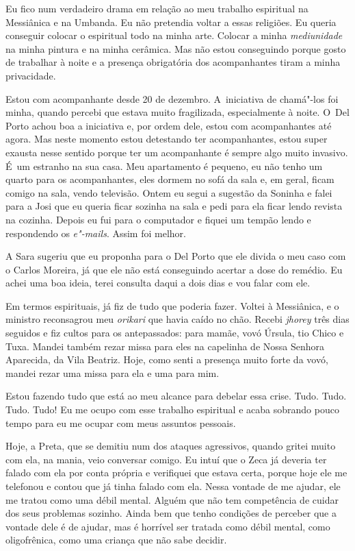 Eu fico num verdadeiro drama em relação ao meu trabalho espiritual na
Messiânica e na Umbanda. Eu não pretendia voltar a essas religiões. Eu
queria conseguir colocar o espiritual todo na minha arte. Colocar a
minha \emph{mediunidade} na minha pintura e na minha cerâmica. Mas não
estou conseguindo porque gosto de trabalhar à noite e a presença
obrigatória dos acompanhantes tiram a minha privacidade.

Estou com acompanhante desde 20 de dezembro. A~iniciativa de chamá"-los
foi minha, quando percebi que estava muito fragilizada, especialmente à
noite. O~Del Porto achou boa a iniciativa e, por ordem dele, estou com
acompanhantes até agora. Mas neste momento estou detestando ter
acompanhantes, estou super exausta nesse sentido porque ter um
acompanhante é sempre algo muito invasivo. É~um estranho na sua casa.
Meu apartamento é pequeno, eu não tenho um quarto para os acompanhantes,
eles dormem no sofá da sala e, em geral, ficam comigo na sala, vendo
televisão. Ontem eu segui a sugestão da Soninha e falei para a Josi que
eu queria ficar sozinha na sala e pedi para ela ficar lendo revista na
cozinha. Depois eu fui para o computador e fiquei um tempão lendo e
respondendo os \emph{e"-mails}. Assim foi melhor.

A Sara sugeriu que eu proponha para o Del Porto que ele divida o meu
caso com o Carlos Moreira, já que ele não está conseguindo acertar a
dose do remédio. Eu achei uma boa ideia, terei consulta daqui a dois
dias e vou falar com ele.

Em termos espirituais, já fiz de tudo que poderia fazer. Voltei à
Messiânica, e o ministro reconsagrou meu \emph{orikari} que havia caído
no chão. Recebi \emph{jhorey} três dias seguidos e fiz cultos para os
antepassados: para mamãe, vovó Úrsula, tio Chico e Tuxa. Mandei também
rezar missa para eles na capelinha de Nossa Senhora Aparecida, da Vila
Beatriz. Hoje, como senti a presença muito forte da vovó, mandei rezar
uma missa para ela e uma para mim.

Estou fazendo tudo que está ao meu alcance para debelar essa crise.
Tudo. Tudo. Tudo. Tudo! Eu me ocupo com esse trabalho espiritual e acaba
sobrando pouco tempo para eu me ocupar com meus assuntos pessoais.

Hoje, a Preta, que se demitiu num dos ataques agressivos, quando gritei
muito com ela, na mania, veio conversar comigo. Eu intuí que o Zeca já
deveria ter falado com ela por conta própria e verifiquei que estava
certa, porque hoje ele me telefonou e contou que já tinha falado com
ela. Nessa vontade de me ajudar, ele me tratou como uma débil mental.
Alguém que não tem competência de cuidar dos seus problemas sozinho.
Ainda bem que tenho condições de perceber que a vontade dele é de
ajudar, mas é horrível ser tratada como débil mental, como oligofrênica,
como uma criança que não sabe decidir.

